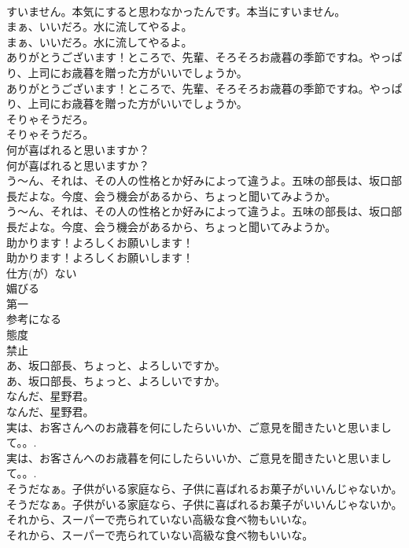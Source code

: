 \documentclass[8pt]{extreport}
\begin{document}
\begin{CJK}{UTF8}{min}
\\	すいません。本気にすると思わなかったんです。本当にすいません。 
\\	まぁ、いいだろ。水に流してやるよ。	
\\	まぁ、いいだろ。水に流してやるよ。 
\\	ありがとうございます！ところで、先輩、そろそろお歳暮の季節ですね。やっぱり、上司にお歳暮を贈った方がいいでしょうか。	
\\	ありがとうございます！ところで、先輩、そろそろお歳暮の季節ですね。やっぱり、上司にお歳暮を贈った方がいいでしょうか。 
\\	そりゃそうだろ。	
\\	そりゃそうだろ。 
\\	何が喜ばれると思いますか？	
\\	何が喜ばれると思いますか？ 
\\	う～ん、それは、その人の性格とか好みによって違うよ。五味の部長は、坂口部長だよな。今度、会う機会があるから、ちょっと聞いてみようか。	
\\	う～ん、それは、その人の性格とか好みによって違うよ。五味の部長は、坂口部長だよな。今度、会う機会があるから、ちょっと聞いてみようか。 
\\	助かります！よろしくお願いします！	
\\	助かります！よろしくお願いします！ 
\\	仕方(が）ない
\\	媚びる
\\	第一
\\	参考になる
\\	態度
\\	禁止
\\	あ、坂口部長、ちょっと、よろしいですか。	
\\	あ、坂口部長、ちょっと、よろしいですか。 
\\	なんだ、星野君。	
\\	なんだ、星野君。 
\\	実は、お客さんへのお歳暮を何にしたらいいか、ご意見を聞きたいと思いまして。。.	
\\	実は、お客さんへのお歳暮を何にしたらいいか、ご意見を聞きたいと思いまして。。. 
\\	そうだなぁ。子供がいる家庭なら、子供に喜ばれるお菓子がいいんじゃないか。	
\\	そうだなぁ。子供がいる家庭なら、子供に喜ばれるお菓子がいいんじゃないか。 
\\	それから、スーパーで売られていない高級な食べ物もいいな。	
\\	それから、スーパーで売られていない高級な食べ物もいいな。 

\end{CJK}
\end{document}
